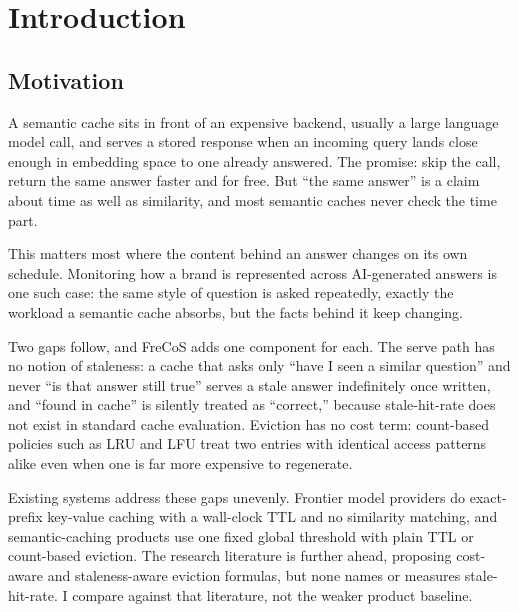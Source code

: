 \documentclass[10pt]{article}
\begin{document}
\section{Introduction}

\subsection{Motivation}
\label{ssec:motivation}

A semantic cache sits in front of an expensive backend, usually a large language model
call, and serves a stored response when an incoming query lands close enough in embedding
space to one already answered. The promise: skip the call, return the same answer faster
and for free. But ``the same answer'' is a claim about time as well as similarity, and
most semantic caches never check the time part.

This matters most where the content behind an answer changes on its own schedule. Monitoring
how a brand is represented across AI-generated answers is one such case: the same style of
question is asked repeatedly, exactly the workload a semantic cache absorbs, but the facts
behind it keep changing.

Two gaps follow, and FreCoS adds one component for each. The serve path has no notion of staleness: a cache
that asks only ``have I seen a similar question'' and never ``is that answer still true''
serves a stale answer indefinitely once written, and ``found in cache'' is silently treated
as ``correct,'' because stale-hit-rate does not exist in standard cache evaluation.
Eviction has no cost term: count-based policies such as LRU and LFU
treat two entries with identical access patterns alike even when one is far more expensive to
regenerate.

Existing systems address these gaps unevenly. Frontier model providers do exact-prefix
key-value caching with a wall-clock TTL and no similarity matching, and semantic-caching
products use one fixed global threshold with plain TTL or count-based eviction. The research
literature is further ahead, proposing cost-aware and staleness-aware eviction formulas, but
none names or measures stale-hit-rate. I compare against that literature, not the weaker
product baseline.
\end{document}
